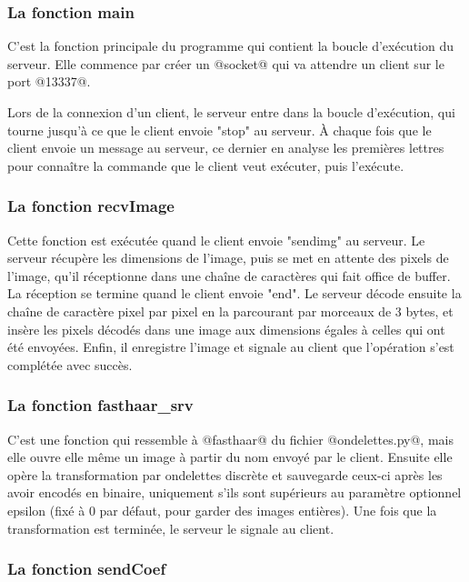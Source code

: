 \documentclass{article}
\begin{document}
\subsubsection{La fonction main}

C'est la fonction principale du programme qui contient la boucle d'exécution du serveur. Elle commence par créer un @socket@ qui va attendre un client sur le port @13337@.

Lors de la connexion d'un client, le serveur entre dans la boucle d'exécution, qui tourne jusqu'à ce que le client envoie "stop" au serveur. À chaque fois que le client envoie un message au serveur, ce dernier en analyse les premières lettres pour connaître la commande que le client veut exécuter, puis l'exécute.

\subsubsection{La fonction recvImage}

Cette fonction est exécutée quand le client envoie "sendimg" au serveur. Le serveur récupère les dimensions de l'image, puis se met en attente des pixels de l'image, qu'il réceptionne dans une chaîne de caractères qui fait office de buffer. La réception se termine quand le client envoie "end". Le serveur décode ensuite la chaîne de caractère pixel par pixel en la parcourant par morceaux de 3 bytes, et insère les pixels décodés dans une image aux dimensions égales à celles qui ont été envoyées. Enfin, il enregistre l'image et signale au client que l'opération s'est complétée avec succès.

\subsubsection{La fonction fasthaar\_srv}

C'est une fonction qui ressemble à @fasthaar@ du fichier @ondelettes.py@, mais elle ouvre elle même un image à partir du nom envoyé par le client. Ensuite elle opère la transformation par ondelettes discrète et sauvegarde ceux-ci après les avoir encodés en binaire, uniquement s'ils sont supérieurs au paramètre optionnel epsilon (fixé à 0 par défaut, pour garder des images entières). Une fois que la transformation est terminée, le serveur le signale au client.

\subsubsection{La fonction sendCoef}
\end{document}
